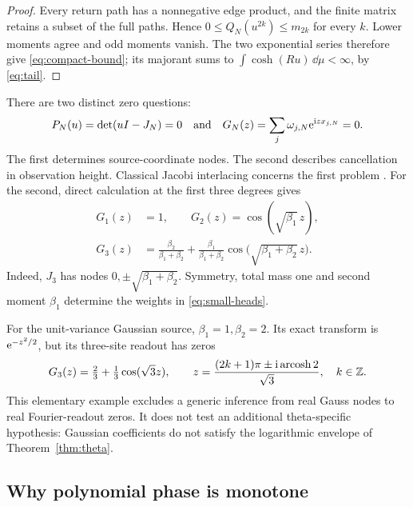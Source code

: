 \begin{proof}
Every return path has a nonnegative edge product, and the finite
matrix retains a subset of the full paths. Hence
\(0\le Q_N(u^{2k})\le m_{2k}\) for every \(k\). Lower moments agree and odd
moments vanish. The two exponential series therefore give
\eqref{eq:compact-bound}; its majorant sums to
\(\int\cosh(Ru)\,\dd\mu<\infty\), by \eqref{eq:tail}.
\end{proof}

There are two distinct zero questions:
\begin{equation}
 P_N(u)=\det(uI-J_N)=0
 \quad\hbox{and}\quad
 G_N(z)=\sum_j\omega_{j,N}\mathrm e^{\mathrm i zx_{j,N}}=0.
 \label{eq:two-zero-problems}
\end{equation}
The first determines source-coordinate nodes. The second describes
cancellation in observation height. Classical Jacobi interlacing
concerns the first problem \cite[\S4.1, Theorem~4.5]{teschl}.
For the second, direct calculation at the first three degrees gives
\begin{equation}
 \begin{aligned}
 G_1(z)&=1,\qquad G_2(z)=\cos(\sqrt{\beta_1}\,z),\\
 G_3(z)&=\frac{\beta_2}{\beta_1+\beta_2}
       +\frac{\beta_1}{\beta_1+\beta_2}
          \cos\bigl(\sqrt{\beta_1+\beta_2}\,z\bigr).
 \end{aligned}
 \label{eq:small-heads}
\end{equation}
Indeed, \(J_3\) has nodes \(0,\pm\sqrt{\beta_1+\beta_2}\).
Symmetry, total mass one and second moment \(\beta_1\) determine
the weights in \eqref{eq:small-heads}.

For the unit-variance Gaussian source, \(\beta_1=1,\beta_2=2\).
Its exact transform is \(\mathrm e^{-z^2/2}\), but its three-site readout
has zeros
\begin{equation}
 G_3(z)=\tfrac23+\tfrac13\cos(\sqrt3z),\qquad
 z=\frac{(2k+1)\pi\pm\mathrm i\operatorname{arcosh} 2}{\sqrt3},\quad k\in\mathbb Z.
 \label{eq:gaussian-counterexample}
\end{equation}
This elementary example excludes a generic inference from real Gauss
nodes to real Fourier-readout zeros. It does not test an additional
theta-specific hypothesis: Gaussian coefficients do not satisfy the
logarithmic envelope of Theorem~\ref{thm:theta}.

\subsection{Why polynomial phase is monotone}

